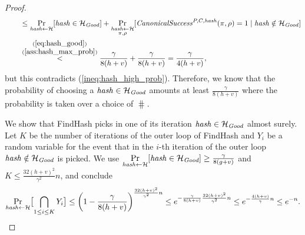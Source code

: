 \begin{proof}
\begin{align*}
  & \mbox\qquad \leq \underset{\operatorname{\mathit{hash}} \leftarrow \mathcal{H}}{\Pr}[\operatorname{\mathit{hash}} \in \mathcal{H}_{\mathit{Good}}] +
  \underset{\substack{\operatorname{\mathit{hash}} \leftarrow \mathcal{H} \\ \pi, \rho}}{\Pr}[\operatorname{\mathit{CanonicalSuccess}}^{P,C,\operatorname{\mathit{hash}}}(\pi, \rho) = 1 \mid \operatorname{\mathit{hash}} \notin \mathcal{H}_{\mathit{Good}}] \\
  & \mbox\qquad  \stackrel{\substack{ (\ref{eq:hash_good}) \\ (\ref{ass:hash_max_prob})}}{<} \frac{\gamma}{8(h+v)} + \frac{\gamma}{8(h+v)} = \frac{\gamma}{4(h+v)},
\end{align*}
but this contradicts (\ref{ineq:hash_high_prob}).
Therefore, we know that the probability of choosing a $\operatorname{\mathit{hash}} \in \mathcal{H}_{\mathit{Good}}$ amounts at least $\frac{\gamma}{8(h+v)}$
where the probability is taken over a choice of $\hash$.

We show that FindHash picks in one of its iteration $\operatorname{\mathit{hash}} \in \mathcal{H}_{\mathit{Good}}$ almost surely.
Let $K$ be the number of iterations of the outer loop of FindHash and $Y_i$ be a random variable for the event
that in the $i$-th iteration of the outer loop $\operatorname{\mathit{hash}} \notin \mathcal{H}_{\mathit{Good}}$ is picked.
We use $\underset{\operatorname{\mathit{hash}} \leftarrow \mathcal{H}}{\Pr}[\operatorname{\mathit{hash}} \in \mathcal{H}_{\textit{Good}}] \geq \frac{\gamma}{8(g+v)}$ and $K \leq \frac{32(h+v)^2}{\gamma^2}n$, and conclude
\begin{align*}
  \underset{\operatorname{\mathit{hash}} \leftarrow \mathcal{H}}{\Pr}\bigl[ \bigcap_{1 \leq i \leq K} Y_i \bigr] \leq \left(1 - \frac{\gamma}{8(h+v)}\right)^{\frac{32(h+v)^2}{\gamma^2}n}
    \leq e^{-\frac{\gamma}{8(h+v)} \frac{32(h+v)^2}{\gamma^2}n}
    \leq e^{-\frac{4(h+v)}{\gamma}n} \leq e^{-n}.
\end{align*}

\end{proof}

